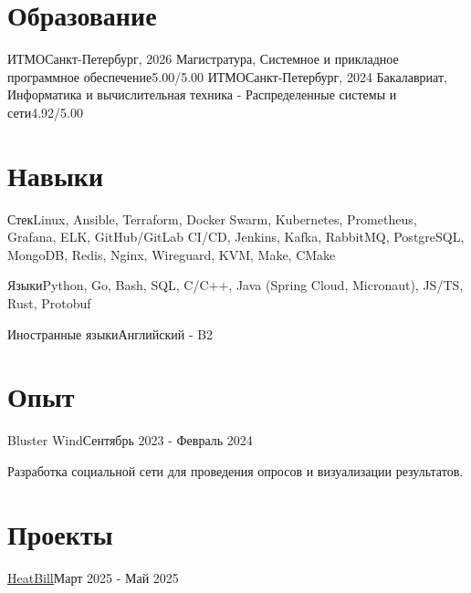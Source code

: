 \documentclass[letterpaper,11pt]{article}
\begin{document}
\section{Образование}
\resumeHeadingListStart
  \resumeHeadingEducation
    {ИТМО}{Санкт-Петербург, 2026}
    {Магистратура, Системное и прикладное программное обеспечение}{5.00/5.00}
  \resumeHeadingEducation
    {ИТМО}{Санкт-Петербург, 2024}
    {Бакалавриат, Информатика и вычислительная техника - Распределенные системы и сети}{4.92/5.00}
\resumeHeadingListEnd

\section{Навыки}
\resumeHeadingListStart
  \resumeHeadingSkills
  {Стек}{Linux, Ansible, Terraform, Docker Swarm, Kubernetes, Prometheus, Grafana, ELK, GitHub/GitLab CI/CD, Jenkins, Kafka, RabbitMQ, PostgreSQL, MongoDB, Redis, Nginx, Wireguard, KVM, Make, CMake}

  \resumeHeadingSkills
   {Языки}{Python, Go, Bash, SQL, C/C++, Java (Spring Cloud, Micronaut), JS/TS, Rust, Protobuf}

  \resumeHeadingSkills
  {Иностранные языки}{Английский - B2}
\resumeHeadingListEnd

\section{Опыт}
\resumeHeadingListStart
  \resumeHeadingExperience
  {Bluster Wind}{Сентябрь 2023 - Февраль 2024}

  \resumeDescription
  {Разработка социальной сети для проведения опросов и визуализации результатов.}

  \resumeItemListStart
  \resumeItemListEnd
\resumeHeadingListEnd

\section{Проекты}
\resumeHeadingListStart
  \resumeHeadingProject
  {\href{https://github.com/klephron/heatbill}{\underline{HeatBill}}}{Март 2025 - Май 2025}
\end{document}
